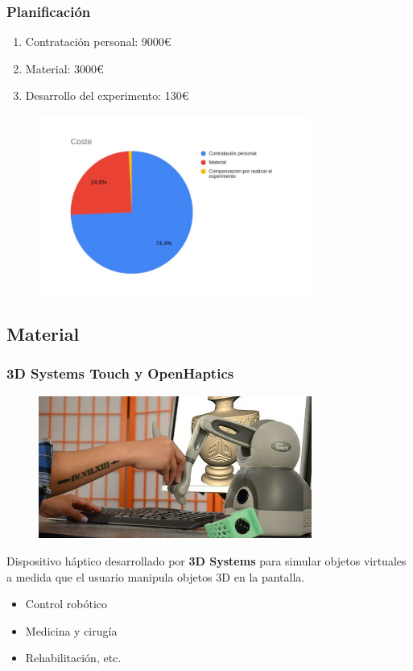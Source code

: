 \documentclass{beamer}
\begin{document}
\begin{frame}
\frametitle{Planificación}
	
\begin{enumerate}
	\item Contratación personal: 9000\euro
	\item Material: 3000\euro
	\item Desarrollo del experimento: 130\euro
\end{enumerate}	
	
\begin{figure}
	\centering
	\includegraphics[width=0.8\textwidth]{coste}
\end{figure}
	
\end{frame}

\subsection{Material}

\begin{frame}
	\frametitle{3D Systems Touch y OpenHaptics}
	
\begin{figure}
	\centering
	\includegraphics[width=0.8\textwidth]{touch}
\end{figure}
	
Dispositivo háptico desarrollado por \textbf{3D Systems} para simular objetos virtuales a medida que el usuario manipula objetos 3D en la pantalla.
\begin{itemize}
	\item Control robótico
	\item Medicina y cirugía
	\item Rehabilitación, etc.
\end{itemize}		
\end{frame}
\end{document}
